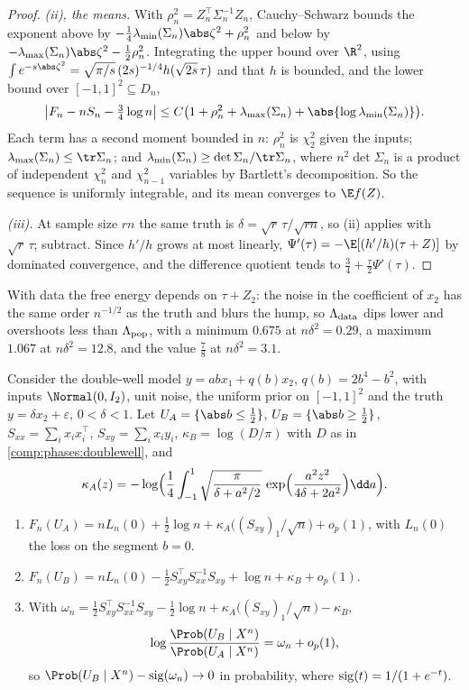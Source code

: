 \begin{refsection}
\begin{proof}
\emph{(ii), the means.} With $\rho_n^2=Z_n^\top\Sigma_n^{-1}Z_n$, Cauchy--Schwarz bounds the exponent above by $-\frac14\lambda_{\min}(\Sigma_n)\abs\zeta^2+\rho_n^2$ and below by $-\lambda_{\max}(\Sigma_n)\abs\zeta^2-\frac12\rho_n^2$. Integrating the upper bound over $\R^2$, using $\int e^{-s\abs\zeta^2}=\sqrt{\pi/s}\,(2s)^{-1/4}h(\sqrt{2s}\,\tau)$ and that $h$ is bounded, and the lower bound over $[-1,1]^2\subseteq D_n$,
\[
\bigl|F_n-nS_n-\tfrac34\log n\bigr|\le C\bigl(1+\rho_n^2+\lambda_{\max}(\Sigma_n)+\abs{\log\lambda_{\min}(\Sigma_n)}\bigr).
\]
Each term has a second moment bounded in $n$: $\rho_n^2$ is $\chi^2_2$ given the inputs; $\lambda_{\max}(\Sigma_n)\le\tr\Sigma_n$; and $\lambda_{\min}(\Sigma_n)\ge\det\Sigma_n/\tr\Sigma_n$, where $n^2\det\Sigma_n$ is a product of independent $\chi^2_n$ and $\chi^2_{n-1}$ variables by Bartlett's decomposition. So the sequence is uniformly integrable, and its mean converges to $\E f(Z)$.

\emph{(iii).} At sample size $rn$ the same truth is $\delta=\sqrt r\,\tau/\sqrt{rn}$, so (ii) applies with $\sqrt r\,\tau$; subtract. Since $h'/h$ grows at most linearly, $\Psi'(\tau)=-\E[(h'/h)(\tau+Z)]$ by dominated convergence, and the difference quotient tends to $\frac34+\frac\tau2\Psi'(\tau)$.
\end{proof}

With data the free energy depends on $\tau+Z_2$: the noise in the coefficient of $x_2$ has the same order $n^{-1/2}$ as the truth and blurs the hump, so $\Lambda_{\mathrm{data}}$ dips lower and overshoots less than $\Lambda_{\mathrm{pop}}$, with a minimum $0.675$ at $n\delta^2=0.29$, a maximum $1.067$ at $n\delta^2=12.8$, and the value $\frac78$ at $n\delta^2=3.1$.

\begin{proposition}\label{prop:phases:doublewell}
Consider the double-well model $y=abx_1+q(b)x_2$, $q(b)=2b^4-b^2$, with inputs $\Normal(0,I_2)$, unit noise, the uniform prior on $[-1,1]^2$ and the truth $y=\delta x_2+\varepsilon$, $0<\delta<1$. Let $U_A=\{\abs b\le\frac12\}$, $U_B=\{\abs b\ge\frac12\}$, $S_{xx}=\sum_ix_ix_i^\top$, $S_{xy}=\sum_ix_iy_i$, $\kappa_B=\log(D/\pi)$ with $D$ as in \cref{comp:phases:doublewell}, and
\[
\kappa_A(z)=-\log\Bigl(\frac14\int_{-1}^1\sqrt{\frac\pi{\delta+a^2/2}}\,\exp\Bigl(\frac{a^2z^2}{4\delta+2a^2}\Bigr)\dd a\Bigr).
\]
\begin{enumerate}[label=(\roman*)]
\item $F_n(U_A)=nL_n(0)+\frac12\log n+\kappa_A\bigl((S_{xy})_1/\sqrt n\bigr)+o_p(1)$, with $L_n(0)$ the loss on the segment $b=0$.
\item $F_n(U_B)=nL_n(0)-\frac12S_{xy}^\top S_{xx}^{-1}S_{xy}+\log n+\kappa_B+o_p(1)$.
\item With $\omega_n=\frac12S_{xy}^\top S_{xx}^{-1}S_{xy}-\frac12\log n+\kappa_A\bigl((S_{xy})_1/\sqrt n\bigr)-\kappa_B$,
\[
\log\frac{\Prob(U_B\mid X^n)}{\Prob(U_A\mid X^n)}=\omega_n+o_p(1),
\]
so $\Prob(U_B\mid X^n)-\phasessig(\omega_n)\to0$ in probability, where $\operatorname{sig}(t)=1/(1+e^{-t})$.
\end{enumerate}
\end{proposition}


\end{refsection}
